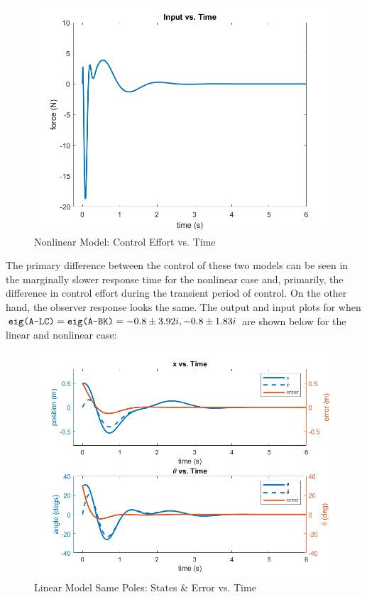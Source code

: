 \documentclass[12pt, letterpaper, onecolumn]{article}
\begin{document}
\begin{figure}[!h]
    \centering
    \includegraphics[width=\linewidth]{figs/p5-b-input.png}
    \caption{Nonlinear Model: Control Effort vs. Time}
    \label{}
\end{figure}

\clearpage

The primary difference between the control of these two models can be seen in the marginally slower response time for the nonlinear case and, primarily, the difference in control effort during the transient period of control. On the other hand, the observer response looks the same. The output and input plots for when $\codeword{eig(A-LC)} = \codeword{eig(A-BK)} = -0.8\pm 3.92i, -0.8\pm1.83i$ are shown below for the linear and nonlinear case:

\begin{figure}[!h]
    \centering
    \includegraphics[width=\linewidth]{figs/p5-cl-states.png}
    \caption{Linear Model Same Poles: States \& Error vs. Time}
    \label{}
\end{figure}
\end{document}
